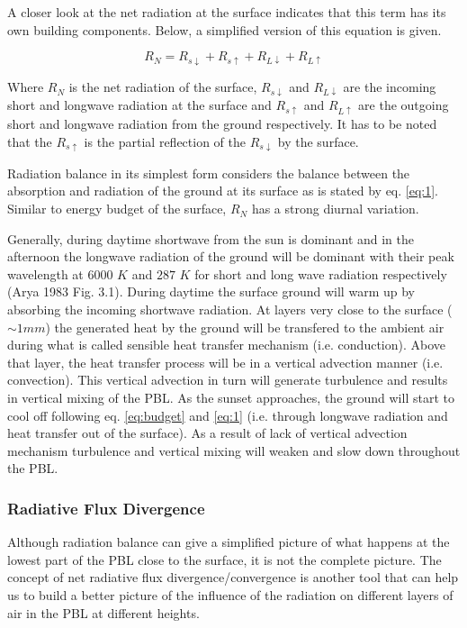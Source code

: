 \documentclass[a4paper,12pt]{article}
\numberwithin{equation}{section} %
\begin{document}
A closer look at the net radiation at the surface indicates that this term has its own building components. Below, a simplified version of this equation is given.

\vspace{0.25cm}
\begin{equation}\label{eq:1}
R_N = R_{s\downarrow} + R_{s\uparrow} + R_{L\downarrow} + R_{L\uparrow}
\end{equation}
\vspace{0.25cm}

Where $R_N$ is the net radiation of the surface, $R_{s\downarrow}$ and $R_{L\downarrow}$ are the incoming short and longwave radiation at the surface and $R_{s\uparrow}$ and $R_{L\uparrow}$ are the outgoing short and longwave radiation from the ground respectively. It has to be noted that the $R_{s\uparrow}$ is the partial reflection of the $R_{s\downarrow}$ by the surface.

Radiation balance in its simplest form considers the balance between the absorption and radiation of the ground at its surface as is stated by eq. \ref{eq:1}. Similar to energy budget of the surface, $R_N$ has a strong diurnal variation. 

Generally, during daytime shortwave from the sun is dominant and in the afternoon the longwave radiation of the ground will be dominant with their peak wavelength at $6000$ $K$ and $287$ $K$ for short and long wave radiation respectively (Arya 1983 Fig. 3.1). During daytime the surface ground will warm up by absorbing the incoming shortwave radiation. At layers very close to the surface ($\sim 1 mm$) the generated heat by the ground will be transfered to the ambient air during what is called sensible heat transfer mechanism (i.e. conduction). Above that layer, the heat transfer process will be in a vertical advection manner (i.e. convection). This vertical advection in turn will generate turbulence and results in vertical mixing of the PBL. As the sunset approaches, the ground will start to cool off following eq. \ref{eq:budget} and \ref{eq:1} (i.e. through longwave radiation and heat transfer out of the surface). As a result of lack of vertical advection mechanism turbulence and vertical mixing will weaken and slow down throughout the PBL.

\subsubsection{Radiative Flux Divergence}

Although radiation balance can give a simplified picture of what happens at the lowest part of the PBL close to the surface, it is not the complete picture. The concept of net radiative flux divergence/convergence is another tool that can help us to build a better picture of the influence of the radiation on different layers of air in the PBL at different heights.
\end{document}
